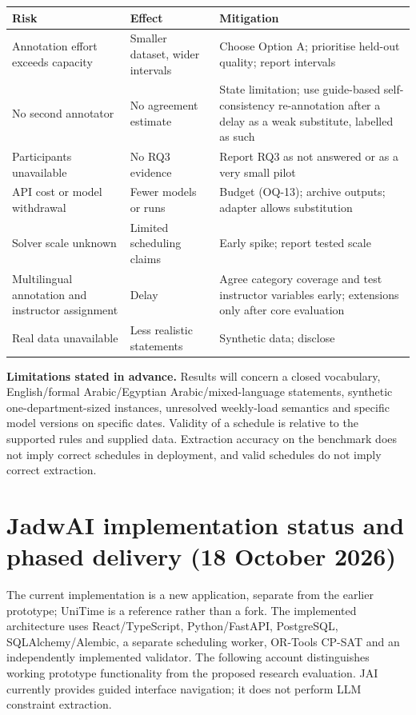 \documentclass[
  11pt,a4paper,oneside]{report}
\begin{document}
\begin{longtable}[]{@{}p{\dimexpr(\linewidth-6\tabcolsep)/3\relax}p{\dimexpr(\linewidth-6\tabcolsep)/3\relax}p{\dimexpr(\linewidth-6\tabcolsep)/3\relax}@{}}
\toprule\noalign{}
Risk & Effect & Mitigation \\
\midrule\noalign{}
\endhead
\bottomrule\noalign{}
\endlastfoot
Annotation effort exceeds capacity & Smaller dataset, wider intervals &
Choose Option A; prioritise held-out quality; report intervals \\
No second annotator & No agreement estimate & State limitation; use
guide-based self-consistency re-annotation after a delay as a weak
substitute, labelled as such \\
Participants unavailable & No RQ3 evidence & Report RQ3 as not answered
or as a very small pilot \\
API cost or model withdrawal & Fewer models or runs & Budget (OQ-13);
archive outputs; adapter allows substitution \\
Solver scale unknown & Limited scheduling claims & Early spike; report
tested scale \\
Multilingual annotation and instructor assignment & Delay & Agree category coverage and test instructor variables early; extensions
only after core evaluation \\
Real data unavailable & Less realistic statements & Synthetic data;
disclose \\
\end{longtable}

\textbf{Limitations stated in advance.} Results will concern a closed
vocabulary, English/formal Arabic/Egyptian Arabic/mixed-language statements, synthetic one-department-sized instances, unresolved weekly-load semantics and
specific model versions on specific dates. Validity of a schedule is
relative to the supported rules and supplied data. Extraction accuracy
on the benchmark does not imply correct schedules in deployment, and
valid schedules do not imply correct extraction.

\section{JadwAI implementation status and phased delivery (18 October 2026)}\label{implementation-status}
The current implementation is a new application, separate from the earlier prototype; UniTime is a reference rather than a fork. The implemented architecture uses React/TypeScript, Python/FastAPI, PostgreSQL, SQLAlchemy/Alembic, a separate scheduling worker, OR-Tools CP-SAT and an independently implemented validator. The following account distinguishes working prototype functionality from the proposed research evaluation. JAI currently provides guided interface navigation; it does not perform LLM constraint extraction.
\end{document}
